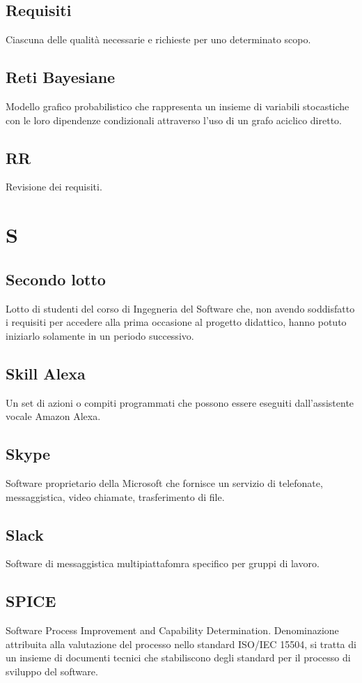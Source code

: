 \subsection*{Requisiti} Ciascuna delle qualità necessarie e richieste per uno determinato scopo.
\subsection*{Reti Bayesiane} Modello grafico probabilistico che rappresenta un insieme di variabili stocastiche con le loro dipendenze condizionali attraverso l'uso di un grafo aciclico diretto.
\subsection*{RR} Revisione dei requisiti.
\newpage
\section{S}
\subsection*{Secondo lotto} Lotto di studenti del corso di Ingegneria del Software che, non avendo soddisfatto i requisiti per accedere alla prima occasione al progetto didattico, hanno potuto iniziarlo solamente in un periodo successivo.
\subsection*{Skill Alexa} Un set di azioni o compiti programmati che possono essere eseguiti dall'assistente vocale Amazon Alexa.
\subsection*{Skype} Software proprietario  della Microsoft che fornisce un servizio di telefonate, messaggistica, video chiamate, trasferimento di file. 
\subsection*{Slack} Software di messaggistica multipiattafomra specifico per gruppi di lavoro.
\subsection*{SPICE} Software Process Improvement and Capability Determination. Denominazione attribuita alla valutazione del processo nello standard ISO/IEC 15504, si tratta di un insieme di documenti tecnici che stabiliscono degli standard per il processo di sviluppo del software.
